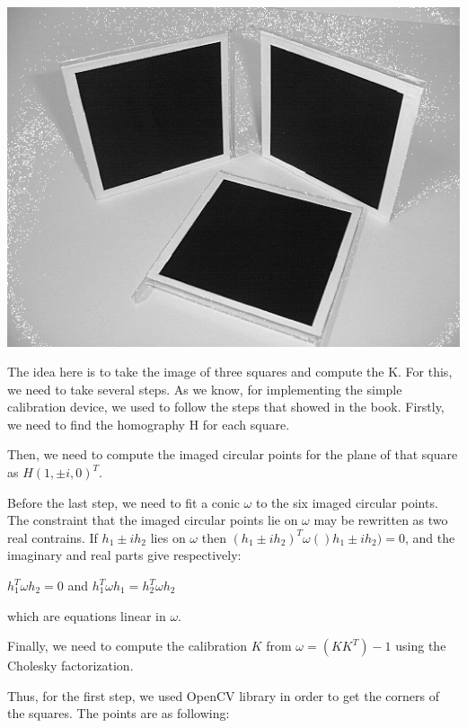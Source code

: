 \documentclass[]{article}
\begin{document}
\centerline {
	\includegraphics[scale=0.5]{squares}
}

The idea here is to take the image of three squares and compute the K. For this, we need to take several steps. As we know, for implementing the simple calibration device, we used to follow the steps that showed in the book. Firstly, we need to find the homography H for each square. 

Then, we need to compute the imaged circular points for the plane of that square as $H(1, \pm i, 0)^T$. 


Before the last step, we need to fit a conic $\omega$ to the six imaged circular points. The constraint that the imaged circular points lie on $\omega$ may be rewritten as two real contrains. If $h_1 \pm ih_2$ lies on $\omega$ then $(h_1 \pm ih_2)^T \omega ()h_1 \pm ih_2) = 0$, and the imaginary and real parts give respectively: 

\vspace{0.5em}

\centerline {
	$h_1^T \omega h_2 = 0$ and $h_1^T \omega h_1 = h_2^T \omega h_2$
}

\vspace{0.5em}

which are equations linear in $\omega$. 

Finally, we need to compute the calibration $K$ from $\omega = (KK^T)-1$ using the Cholesky factorization. 

\vspace{0.4em}

Thus, for the first step, we used OpenCV library in order to get the corners of the squares. The points are as following:
\end{document}
